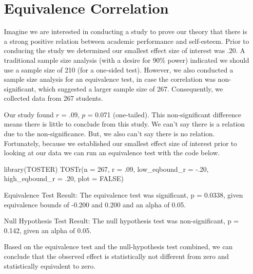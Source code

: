 \documentclass[
]{krantz}
\makeatletter
\newenvironment{Shaded}{\begin{snugshade}}{\end{snugshade}}
\newcommand{\AttributeTok}[1]{\textcolor[rgb]{0.61,0.61,0.61}{#1}}
\newcommand{\ConstantTok}[1]{\textcolor[rgb]{0,0,0}{#1}}
\newcommand{\DecValTok}[1]{\textcolor[rgb]{0.06,0.06,0.06}{#1}}
\newcommand{\FloatTok}[1]{\textcolor[rgb]{0.06,0.06,0.06}{#1}}
\newcommand{\FunctionTok}[1]{\textcolor[rgb]{0,0,0}{#1}}
\newcommand{\NormalTok}[1]{#1}
\newcommand{\OtherTok}[1]{\textcolor[rgb]{0.37,0.37,0.37}{#1}}
\newcommand{\SpecialCharTok}[1]{\textcolor[rgb]{0,0,0}{#1}}
\newenvironment{kframe}{%
\medskip{}
\setlength{\fboxsep}{.8em}
 \def\at@end@of@kframe{}%
 \ifinner\ifhmode%
  \def\at@end@of@kframe{\end{minipage}}%
  \begin{minipage}{\columnwidth}%
 \fi\fi%
 \def\FrameCommand##1{\hskip\@totalleftmargin \hskip-\fboxsep
 \colorbox{shadecolor}{##1}\hskip-\fboxsep
     \hskip-\linewidth \hskip-\@totalleftmargin \hskip\columnwidth}%
 \MakeFramed {\advance\hsize-\width
   \@totalleftmargin\z@ \linewidth\hsize
   \@setminipage}}%
 {\par\unskip\endMakeFramed%
 \at@end@of@kframe}
\renewenvironment{Shaded}{\begin{kframe}}{\end{kframe}}
\makeatother
\begin{document}
\hypertarget{equivalence-correlation}{%
\section{Equivalence Correlation}\label{equivalence-correlation}}

Imagine we are interested in conducting a study to prove our theory that there is a strong positive relation between academic performance and self-esteem. Prior to conducing the study we determined our smallest effect size of interest was .20. A traditional sample size analysis (with a desire for 90\% power) indicated we should use a sample size of 210 (for a one-sided test). However, we also conducted a sample size analysis for an equivalence test, in case the correlation was non-significant, which suggested a larger sample size of 267. Consequently, we collected data from 267 students.

Our study found \(r\) = .09, \(p\) = 0.071 (one-tailed). This non-significant difference means there is little to conclude from this study. We can't say there is a relation due to the non-significance. But, we also can't say there is no relation. Fortunately, because we established our smallest effect size of interest prior to looking at our data we can run an equivalence test with the code below.

\begin{Shaded}
\begin{Highlighting}[]
\FunctionTok{library}\NormalTok{(TOSTER)}
\FunctionTok{TOSTr}\NormalTok{(}\AttributeTok{n =} \DecValTok{267}\NormalTok{,}
      \AttributeTok{r =}\NormalTok{ .}\DecValTok{09}\NormalTok{,}
      \AttributeTok{low\_eqbound\_r =} \SpecialCharTok{{-}}\NormalTok{.}\DecValTok{20}\NormalTok{,}
      \AttributeTok{high\_eqbound\_r =}\NormalTok{ .}\DecValTok{20}\NormalTok{, }
      \AttributeTok{plot =} \ConstantTok{FALSE}\NormalTok{)}
\end{Highlighting}
\end{Shaded}

\begin{Shaded}
\begin{Highlighting}[]
\NormalTok{Equivalence Test Result}\SpecialCharTok{:}
\NormalTok{The equivalence test was significant, p }\OtherTok{=} \FloatTok{0.0338}\NormalTok{, }
\NormalTok{given equivalence bounds of }\SpecialCharTok{{-}}\FloatTok{0.200}\NormalTok{ and }\FloatTok{0.200}\NormalTok{ and an alpha of }\DecValTok{0}\NormalTok{.}\FloatTok{05.}

\NormalTok{Null Hypothesis Test Result}\SpecialCharTok{:}
\NormalTok{The null hypothesis test was non}\SpecialCharTok{{-}}\NormalTok{significant, p }\OtherTok{=} \FloatTok{0.142}\NormalTok{, given an alpha of }\DecValTok{0}\NormalTok{.}\FloatTok{05.}

\NormalTok{Based on the equivalence test and the null}\SpecialCharTok{{-}}\NormalTok{hypothesis test combined, }
\NormalTok{we can conclude that the observed effect is statistically not different}
\NormalTok{from zero and statistically equivalent to zero.}
\end{Highlighting}
\end{Shaded}
\end{document}

